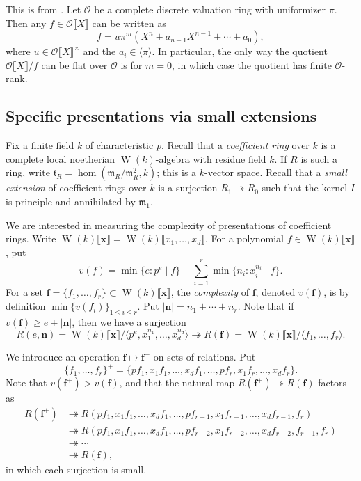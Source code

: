 \documentclass{amsart}
\DeclareMathOperator{\witt}{W}
\newcommand{\cO}{\mathcal{O}}
\newcommand{\fm}{\mathfrak{m}}
\newcommand{\ft}{\mathfrak{t}}
\newcommand{\epic}{\twoheadrightarrow}
\newcommand{\pow}[1]{\llbracket #1 \rrbracket}
\begin{document}
This is from \cite[VII \S 3.8, pr.6]{bourbaki-comm-alg}. Let $\cO$ be a 
complete discrete valuation ring with uniformizer $\pi$. Then any 
$f\in \cO\llbracket X\rrbracket$ can be written as 
\[
  f = u \pi^m \left(X^n+a_{n-1} X^{n-1} + \cdots + a_0\right),
\]
where $u\in \cO\llbracket X\rrbracket^\times$ and the 
$a_i\in \langle \pi\rangle$. In particular, the only way the quotient 
$\cO\llbracket X\rrbracket/f$ can be flat over $\cO$ is for 
$m=0$, in which case the quotient has finite $\cO$-rank. 


\subsection{Specific presentations via small extensions}

Fix a finite field $k$ of characteristic $p$. Recall that a \emph{coefficient 
ring} over $k$ is a complete local noetherian $\witt(k)$-algebra with residue 
field $k$. If $R$ is such a ring, write $\ft_R=\hom(\fm_R/\fm_R^2,k)$; this is 
a $k$-vector space. Recall that a \emph{small extension} of coefficient rings 
over $k$ is a surjection $R_1\epic R_0$ such that the kernel $I$ is principle 
and annihilated by $\fm_1$.

We are interested in measuring the complexity of presentations of coefficient 
rings. Write $\witt(k)\pow{\bm x}=\witt(k)\pow{x_1,\dots,x_d}$. For a 
polynomial $f\in \witt(k)\pow{\bm x}$, put 
\[
  v(f) = \min\{e:p^e\mid f\} + \sum_{i=1}^r \min\{n_i:x_i^{n_i}\mid f\} .
\]
For a set $\bm f=\{f_1,\dots,f_r\}\subset \witt(k)\pow{\bm x}$, the 
\emph{complexity} of $\bm f$, denoted $v(\bm f)$, is by definition 
$\min\{v(f_i)\}_{1\leqslant i\leqslant r}$. Put $|\bm n|=n_1+\cdots+n_r$. 
Note that if $v(\bm f)\geqslant e+|\bm n|$, then we have a surjection 
\[
  R(e,\bm n) = \witt(k)\pow{\bm x}/\langle p^e,x_1^{n_1},\dots,x_d^{n_d}\rangle \epic R(\bm f) = \witt(k)\pow{\bm x}/\langle f_1,\dots,f_r\rangle .
\]

We introduce an operation $\bm f\mapsto \bm f^+$ on sets of relations. Put 
\[
  \{f_1,\dots,f_r\}^+ = \{p f_1,x_1 f_1,\dots,x_d f_1,\dots,p f_r,x_1 f_r,\dots,x_d f_r\} .
\]
Note that $v(\bm f^+)>v(\bm f)$, and that the natural map 
$R(\bm f^+)\epic R(\bm f)$ factors as 
\begin{align*}
  R(\bm f^+) 
    &\epic R(p f_1,x_1 f_1,\dots,x_d f_1,\dots,p f_{r-1},x_1 f_{r-1},\dots,x_d f_{r-1},f_r) \\
    &\epic R(p f_1,x_1 f_1,\dots,x_d f_1,\dots,p f_{r-2},x_1 f_{r-2},\dots,x_d f_{r-2},f_{r-1},f_r) \\
    &\epic \cdots \\
    &\epic R(\bm f) ,
\end{align*}
in which each surjection is small. 
\end{document}
